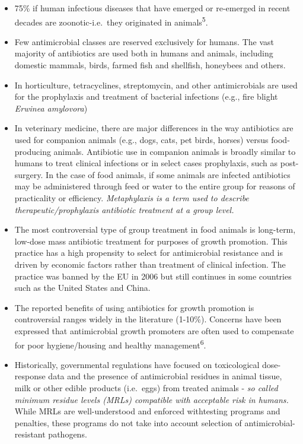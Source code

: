 \documentclass[
]{book}
\providecommand{\tightlist}{%
  \setlength{\itemsep}{0pt}\setlength{\parskip}{0pt}}
\begin{document}
\begin{itemize}
\tightlist
\item
  75\% if human infectious diseases that have emerged or re-emerged in recent decades are zoonotic-i.e.~they originated in animals\textsuperscript{5}.
\item
  Few antimicrobial classes are reserved exclusively for humans. The vast majority of antibiotics are used both in humans and animals, including domestic mammals, birds, farmed fish and shellfish, honeybees and others.
\item
  In horticulture, tetracyclines, streptomycin, and other antimicrobials are used for the prophylaxis and treatment of bacterial infections (e.g., fire blight \emph{Erwinea amylovora})
\item
  In veterinary medicine, there are major differences in the way antibiotics are used for companion animals (e.g., dogs, cats, pet birds, horses) versus food-producing animals. Antibiotic use in companion animals is broadly similar to humans to treat clinical infections or in select cases prophylaxis, such as post-surgery. In the case of food animals, if some animals are infected antibiotics may be administered through feed or water to the entire group for reasons of practicality or efficiency. \emph{Metaphylaxis is a term used to describe therapeutic/prophylaxis antibiotic treatment at a group level.}
\item
  The most controversial type of group treatment in food animals is long-term, low-dose mass antibiotic treatment for purposes of growth promotion. This practice has a high propensity to select for antimicrobial resistance and is driven by economic factors rather than treatment of clinical infection. The practice was banned by the EU in 2006 but still continues in some countries such as the United States and China.
\item
  The reported benefits of using antibiotics for growth promotion is controversial ranges widely in the literature (1-10\%). Concerns have been expressed that antimicrobial growth promoters are often used to compensate for poor hygiene/housing and healthy management\textsuperscript{6}.
\item
  Historically, governmental regulations have focused on toxicological dose-response data and the presence of antimicrobial residues in animal tissue, milk or other edible products (i.e.~eggs) from treated animals - \emph{so called minimum residue levels (MRLs) compatible with acceptable risk in humans.} While MRLs are well-understood and enforced withtesting programs and penalties, these programs do not take into account selection of antimicrobial-resistant pathogens.

\end{itemize}
\end{document}
